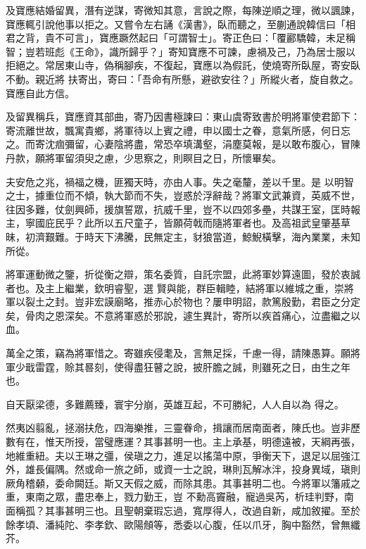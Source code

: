 \begin{pinyinscope}
 及寶應結婚留異，潛有逆謀，寄微知其意，言說之際，每陳逆順之理，微以諷諫，寶應輒引說他事以拒之。又嘗令左右誦《漢書》，臥而聽之，至蒯通說韓信曰「相君之背，貴不可言」，寶應蹶然起曰「可謂智士」。寄正色曰：「覆酈驕韓，未足稱智；豈若班彪《王命》，識所歸乎？」寄知寶應不可諫，慮禍及己，乃為居士服以拒絕之。常居東山寺，偽稱腳疾，不復起，寶應以為假託，使燒寄所臥屋，寄安臥不動。親近將
 扶寄出，寄曰：「吾命有所懸，避欲安往？」所縱火者，旋自救之。寶應自此方信。



 及留異稱兵，寶應資其部曲，寄乃因書極諫曰：東山虞寄致書於明將軍使君節下：寄流離世故，飄寓貴鄉，將軍待以上賓之禮，申以國士之眷，意氣所感，何日忘之。而寄沈痼彌留，心妻陰將盡，常恐卒填溝壑，涓塵莫報，是以敢布腹心，冒陳丹款，願將軍留須臾之慮，少思察之，則瞑目之日，所懷畢矣。



 夫安危之兆，禍福之機，匪獨天時，亦由人事。失之毫釐，差以千里。是
 以明智之士，據重位而不傾，執大節而不失，豈惑於浮辭哉？將軍文武兼資，英威不世，往因多難，仗劍興師，援旗誓眾，抗威千里，豈不以四郊多壘，共謀王室，匡時報主，寧國庇民乎？此所以五尺童子，皆願荷戟而隨將軍者也。及高祖武皇肇基草昧，初濟艱難。于時天下沸騰，民無定主，豺狼當道，鯨鯢橫擊，海內業業，未知所從。



 將軍運動微之鑒，折從衡之辯，策名委質，自託宗盟，此將軍妙算遠圖，發於衷誠者也。及主上繼業，欽明睿聖，選
 賢與能，群臣輯睦，結將軍以維城之重，崇將軍以裂土之封。豈非宏謨廟略，推赤心於物也？屢申明詔，款篤殷勤，君臣之分定矣，骨肉之恩深矣。不意將軍惑於邪說，遽生異計，寄所以疾首痛心，泣盡繼之以血。



 萬全之策，竊為將軍惜之。寄雖疾侵耄及，言無足採，千慮一得，請陳愚算。願將軍少戢雷霆，賒其晷刻，使得盡狂瞽之說，披肝膽之誠，則雖死之日，由生之年也。



 自天厭梁德，多難薦臻，寰宇分崩，英雄互起，不可勝紀，人人自以為
 得之。



 然夷凶翦亂，拯溺扶危，四海樂推，三靈眷命，揖讓而居南面者，陳氏也。豈非歷數有在，惟天所授，當璧應運？其事甚明一也。主上承基，明德遠被，天綱再張，地維重紐。夫以王琳之彊，侯瑱之力，進足以搖蕩中原，爭衡天下，退足以屈強江外，雄長偏隅。然或命一旅之師，或資一士之說，琳則瓦解冰泮，投身異域，瑱則厥角稽顙，委命闕廷。斯又天假之威，而除其患。其事甚明二也。今將軍以籓戚之重，東南之眾，盡忠奉上，戮力勤王，豈
 不勳高竇融，寵過吳芮，析珪判野，南面稱孤？其事甚明三也。且聖朝棄瑕忘過，寬厚得人，改過自新，咸加敘擢。至於餘孝頃、潘純陀、李孝欽、歐陽頠等，悉委以心腹，任以爪牙，胸中豁然，曾無纖芥。




\end{pinyinscope}
